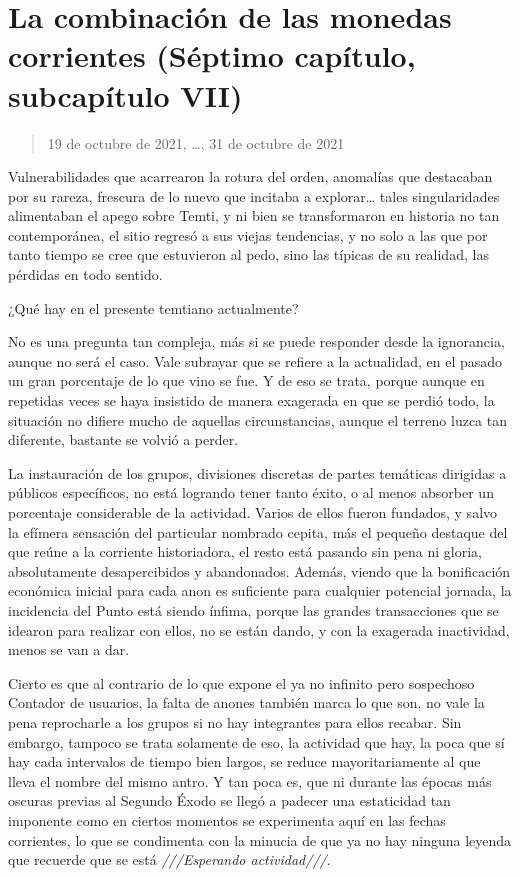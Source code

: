 \documentclass[
  spanish,
]{book}
\begin{document}
\hypertarget{la-combinaciuxf3n-de-las-monedas-corrientes-suxe9ptimo-capuxedtulo-subcapuxedtulo-vii}{%
\section{La combinación de las monedas corrientes (Séptimo capítulo, subcapítulo VII)}\label{la-combinaciuxf3n-de-las-monedas-corrientes-suxe9ptimo-capuxedtulo-subcapuxedtulo-vii}}

\begin{quote}
19 de octubre de 2021, \ldots, 31 de octubre de 2021
\end{quote}

Vulnerabilidades que acarrearon la rotura del orden, anomalías que destacaban por su rareza, frescura de lo nuevo que incitaba a explorar\ldots{} tales singularidades alimentaban el apego sobre Temti, y ni bien se transformaron en historia no tan contemporánea, el sitio regresó a sus viejas tendencias, y no solo a las que por tanto tiempo se cree que estuvieron al pedo, sino las típicas de su realidad, las pérdidas en todo sentido.

¿Qué hay en el presente temtiano actualmente?

No es una pregunta tan compleja, más si se puede responder desde la ignorancia, aunque no será el caso. Vale subrayar que se refiere a la actualidad, en el pasado un gran porcentaje de lo que vino se fue. Y de eso se trata, porque aunque en repetidas veces se haya insistido de manera exagerada en que se perdió todo, la situación no difiere mucho de aquellas circunstancias, aunque el terreno luzca tan diferente, bastante se volvió a perder.

La instauración de los grupos, divisiones discretas de partes temáticas dirigidas a públicos específicos, no está logrando tener tanto éxito, o al menos absorber un porcentaje considerable de la actividad. Varios de ellos fueron fundados, y salvo la efímera sensación del particular nombrado cepita, más el pequeño destaque del que reúne a la corriente historiadora, el resto está pasando sin pena ni gloria, absolutamente desapercibidos y abandonados. Además, viendo que la bonificación económica inicial para cada anon es suficiente para cualquier potencial jornada, la incidencia del Punto está siendo ínfima, porque las grandes transacciones que se idearon para realizar con ellos, no se están dando, y con la exagerada inactividad, menos se van a dar.

Cierto es que al contrario de lo que expone el ya no infinito pero sospechoso Contador de usuarios, la falta de anones también marca lo que son, no vale la pena reprocharle a los grupos si no hay integrantes para ellos recabar. Sin embargo, tampoco se trata solamente de eso, la actividad que hay, la poca que sí hay cada intervalos de tiempo bien largos, se reduce mayoritariamente al que lleva el nombre del mismo antro. Y tan poca es, que ni durante las épocas más oscuras previas al Segundo Éxodo se llegó a padecer una estaticidad tan imponente como en ciertos momentos se experimenta aquí en las fechas corrientes, lo que se condimenta con la minucia de que ya no hay ninguna leyenda que recuerde que se está \emph{///Esperando actividad///}.
\end{document}
